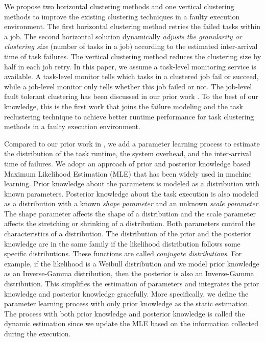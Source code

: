 \documentclass{IOS-Book-Article}
\begin{document}
We propose two horizontal clustering methods and one vertical clustering methods to improve the existing clustering techniques in a faulty execution environment. The first horizontal clustering method retries the failed tasks within a job. The second horizontal solution dynamically \emph{adjusts the granularity or clustering size} (number of tasks in a job) according to the estimated inter-arrival time of task failures. The vertical clustering method reduces the clustering size by half in each job retry. 
In this paper, we assume a task-level monitoring service is available. A task-level monitor tells which tasks in a clustered job fail or succeed, while a job-level monitor only tells whether this job failed or not. The job-level fault tolerant clustering has been discussed in our prior work \cite{Chen2012}. To the best of our knowledge, this is the first work that joins the failure modeling and the task reclustering technique to achieve better runtime performance for task clustering methods in a faulty execution environment. 



Compared to our prior work in \cite{Chen2012}, we add a parameter learning process to estimate the distribution of the task runtime, the system overhead, and the inter-arrival time of failures. We adopt an approach of prior and posterior knowledge based Maximum Likelihood Estimation (MLE) that has been widely used in machine learning. Prior knowledge about the parameters is modeled as a distribution with known parameters. Posterior knowledge about the task execution is also modeled as a distribution with a known \emph{shape parameter} and an unknown \emph{scale parameter}. The shape parameter affects the shape of a distribution and the scale parameter affects the stretching or shrinking of a distribution. Both parameters control the characteristics of a distribution. The distribution of the prior and the posterior knowledge are in the same family if the likelihood distribution follows some specific distributions. These functions are called \emph{conjugate distributions}. For example, if the likelihood is a Weibull distribution and we model prior knowledge as an Inverse-Gamma distribution, then the posterior is also an Inverse-Gamma distribution. This simplifies the estimation of parameters and integrates the prior knowledge and posterior knowledge gracefully. More specifically, we define the parameter learning process with only prior knowledge as the static estimation. The process with both prior knowledge and posterior knowledge is called the dynamic estimation since we update the MLE based on the information collected during the execution.  
\end{document}
